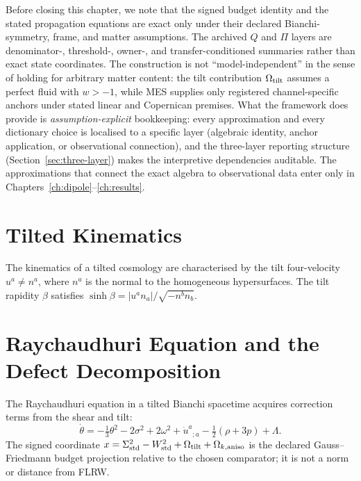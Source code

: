 Before closing this chapter, we note that the signed budget identity
and the stated propagation equations are exact only under their
declared Bianchi-symmetry, frame, and matter assumptions.  The
archived $Q$ and $\Pi$ layers are denominator-, threshold-, owner-,
and transfer-conditioned summaries rather than exact state
coordinates.  The construction is not
``model-independent'' in the sense of holding for arbitrary
matter content: the tilt contribution $\Omega_{\mathrm{tilt}}$ assumes a
perfect fluid with $w > -1$, while MES supplies only registered
channel-specific anchors under stated linear and Copernican premises.
What the framework does provide
is \emph{assumption-explicit} bookkeeping: every approximation
and every dictionary choice is localised to a specific layer
(algebraic identity, anchor application, or observational
connection), and the three-layer reporting structure
(Section~\ref{sec:three-layer}) makes the interpretive
dependencies auditable.  The approximations that connect the
exact algebra to observational data enter only in
Chapters~\ref{ch:dipole}--\ref{ch:results}.


\section{Tilted Kinematics}
\label{sec:tilted-kinematics}

The kinematics of a tilted cosmology are characterised by the tilt
four-velocity $u^a \neq n^a$, where $n^a$ is the normal to the homogeneous
hypersurfaces.  The tilt rapidity $\beta$ satisfies $\sinh\beta = |u^a n_a|/\sqrt{-n^b n_b}$.

\section{Raychaudhuri Equation and the Defect Decomposition}
\label{sec:tilted-raych-defect}

The Raychaudhuri equation in a tilted Bianchi spacetime acquires
correction terms from the shear and tilt:
\begin{equation}
\dot{\theta} = -\tfrac{1}{3}\theta^2 - 2\sigma^2 + 2\omega^2 + \dot{u}^a{}_{;a} - \tfrac{1}{2}(\rho + 3p) + \Lambda.
\end{equation}
The signed coordinate
$x = \Sigma^2_{\mathrm{std}} - W^2_{\mathrm{std}} + \Omega_{\mathrm{tilt}} + \Omega_{k,\mathrm{aniso}}$ is the declared
Gauss--Friedmann budget projection relative to the chosen comparator;
it is not a norm or distance from FLRW.

